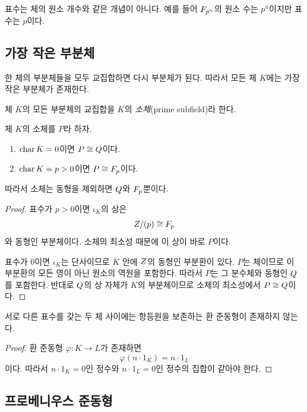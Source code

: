 \begin{pitfall}
표수는 체의 원소 개수와 같은 개념이 아니다. 예를 들어 $F_{p^n}$의 원소 수는 $p^n$이지만 표수는 $p$이다.
\end{pitfall}

\subsection{가장 작은 부분체}

한 체의 부분체들을 모두 교집합하면 다시 부분체가 된다. 따라서 모든 체 $K$에는 가장 작은 부분체가 존재한다.

\begin{definition}[소체]
체 $K$의 모든 부분체의 교집합을 $K$의 \emph{소체}(prime subfield)라 한다.
\end{definition}

\begin{theorem}[소체의 분류]
체 $K$의 소체를 $P$라 하자.
\begin{enumerate}[label=(\roman*)]
  \item $\operatorname{char} K=0$이면 $P\cong Q$이다.
  \item $\operatorname{char} K=p>0$이면 $P\cong F_p$이다.
\end{enumerate}
따라서 소체는 동형을 제외하면 $Q$와 $F_p$뿐이다.
\end{theorem}

\begin{proof}
표수가 $p>0$이면 $\iota_K$의 상은
\[
  Z/(p)\cong F_p
\]
와 동형인 부분체이다. 소체의 최소성 때문에 이 상이 바로 $P$이다.

표수가 $0$이면 $\iota_K$는 단사이므로 $K$ 안에 $Z$의 동형인 부분환이 있다. $P$는 체이므로 이 부분환의 모든 영이 아닌 원소의 역원을 포함한다. 따라서 $P$는 그 분수체와 동형인 $Q$를 포함한다. 반대로 $Q$의 상 자체가 $K$의 부분체이므로 소체의 최소성에서 $P\cong Q$이다.
\end{proof}

\begin{corollary}
서로 다른 표수를 갖는 두 체 사이에는 항등원을 보존하는 환 준동형이 존재하지 않는다.
\end{corollary}

\begin{proof}
환 준동형 $\varphi:K\to L$가 존재하면
\[
  \varphi(n\cdot1_K)=n\cdot1_L
\]
이다. 따라서 $n\cdot1_K=0$인 정수와 $n\cdot1_L=0$인 정수의 집합이 같아야 한다.
\end{proof}

\subsection{프로베니우스 준동형}

